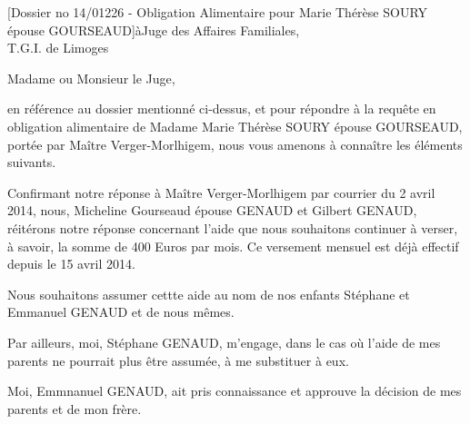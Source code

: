 \documentclass[a4paper,10pt]{article}
\begin{document}

\begin{letter}[Dossier no 14/01226 - Obligation Alimentaire pour Marie Thérèse SOURY épouse GOURSEAUD]{à}{Juge des Affaires Familiales,\\T.G.I. de Limoges}

Madame ou Monsieur le Juge,

en référence au dossier mentionné ci-dessus, et pour répondre à la requête en
obligation alimentaire de Madame Marie Thérèse SOURY épouse GOURSEAUD, 
portée par Maître Verger-Morlhigem, nous vous amenons à connaître les
éléments suivants.


Confirmant notre réponse à Maître Verger-Morlhigem par courrier du 2 avril 2014,
nous, Micheline Gourseaud épouse GENAUD et Gilbert GENAUD, réitérons notre
réponse concernant l'aide que nous souhaitons continuer à verser, à savoir, la
somme de 400 Euros par mois. Ce versement mensuel est déjà effectif depuis le 15
avril 2014.

Nous souhaitons assumer cettte aide au nom de nos enfants Stéphane et Emmanuel
GENAUD et de nous mêmes.


Par ailleurs, moi, Stéphane GENAUD, m'engage, dans le cas où l'aide de mes
parents ne pourrait plus être assumée, à me substituer à eux.


Moi, Emmnanuel GENAUD, ait pris connaissance et approuve la décision de mes
parents et de mon frère.


\end{letter}
\begin{flushright}
\end{flushright}
\end{document}

